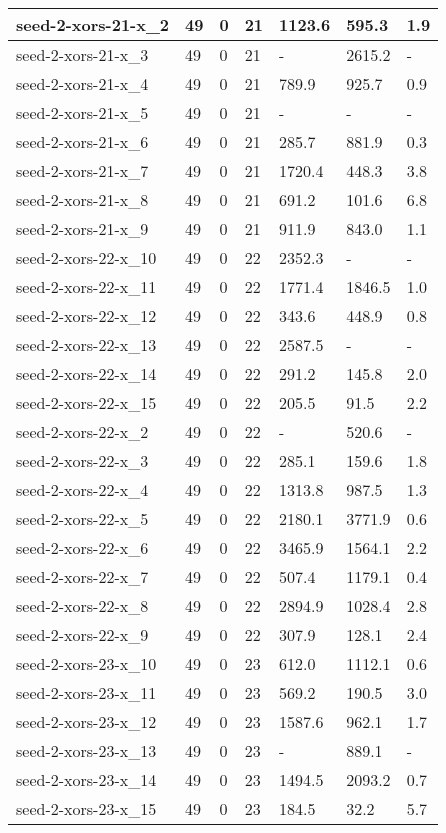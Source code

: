 \begin{scriptsize}
\begin{longtable}{|p{5cm}|l|l|l|l|l|l|}
seed-2-xors-21-x\_2&49&0&21&1123.6&595.3&1.9 \\ \hline 
seed-2-xors-21-x\_3&49&0&21&-&2615.2&- \\ \hline 
seed-2-xors-21-x\_4&49&0&21&789.9&925.7&0.9 \\ \hline 
seed-2-xors-21-x\_5&49&0&21&-&-&- \\ \hline 
seed-2-xors-21-x\_6&49&0&21&285.7&881.9&0.3 \\ \hline 
seed-2-xors-21-x\_7&49&0&21&1720.4&448.3&3.8 \\ \hline 
seed-2-xors-21-x\_8&49&0&21&691.2&101.6&6.8 \\ \hline 
seed-2-xors-21-x\_9&49&0&21&911.9&843.0&1.1 \\ \hline 
seed-2-xors-22-x\_10&49&0&22&2352.3&-&- \\ \hline 
seed-2-xors-22-x\_11&49&0&22&1771.4&1846.5&1.0 \\ \hline 
seed-2-xors-22-x\_12&49&0&22&343.6&448.9&0.8 \\ \hline 
seed-2-xors-22-x\_13&49&0&22&2587.5&-&- \\ \hline 
seed-2-xors-22-x\_14&49&0&22&291.2&145.8&2.0 \\ \hline 
seed-2-xors-22-x\_15&49&0&22&205.5&91.5&2.2 \\ \hline 
seed-2-xors-22-x\_2&49&0&22&-&520.6&- \\ \hline 
seed-2-xors-22-x\_3&49&0&22&285.1&159.6&1.8 \\ \hline 
seed-2-xors-22-x\_4&49&0&22&1313.8&987.5&1.3 \\ \hline 
seed-2-xors-22-x\_5&49&0&22&2180.1&3771.9&0.6 \\ \hline 
seed-2-xors-22-x\_6&49&0&22&3465.9&1564.1&2.2 \\ \hline 
seed-2-xors-22-x\_7&49&0&22&507.4&1179.1&0.4 \\ \hline 
seed-2-xors-22-x\_8&49&0&22&2894.9&1028.4&2.8 \\ \hline 
seed-2-xors-22-x\_9&49&0&22&307.9&128.1&2.4 \\ \hline 
seed-2-xors-23-x\_10&49&0&23&612.0&1112.1&0.6 \\ \hline 
seed-2-xors-23-x\_11&49&0&23&569.2&190.5&3.0 \\ \hline 
seed-2-xors-23-x\_12&49&0&23&1587.6&962.1&1.7 \\ \hline 
seed-2-xors-23-x\_13&49&0&23&-&889.1&- \\ \hline 
seed-2-xors-23-x\_14&49&0&23&1494.5&2093.2&0.7 \\ \hline 
seed-2-xors-23-x\_15&49&0&23&184.5&32.2&5.7 \\ \hline 

\end{longtable}
\end{scriptsize}
